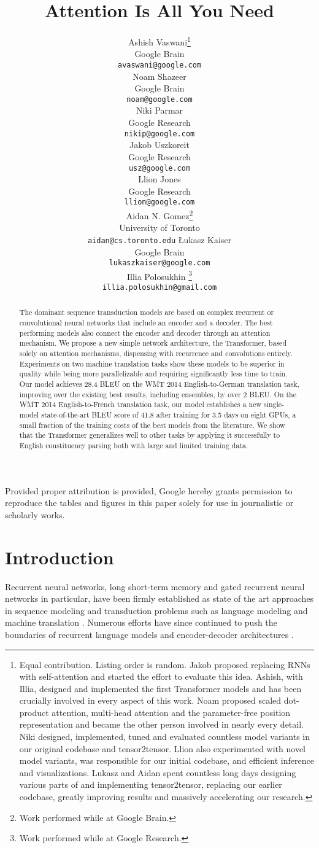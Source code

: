 \documentclass{article}
\title{Attention Is All You Need}
\author{
  \AND
  Ashish Vaswani\thanks{Equal contribution. Listing order is random. Jakob proposed replacing RNNs with self-attention and started the effort to evaluate this idea.
Ashish, with Illia, designed and implemented the first Transformer models and has been crucially involved in every aspect of this work. Noam proposed scaled dot-product attention, multi-head attention and the parameter-free position representation and became the other person involved in nearly every detail. Niki designed, implemented, tuned and evaluated countless model variants in our original codebase and tensor2tensor. Llion also experimented with novel model variants, was responsible for our initial codebase, and efficient inference and visualizations. Lukasz and Aidan spent countless long days designing various parts of and implementing tensor2tensor, replacing our earlier codebase, greatly improving results and massively accelerating our research.
}\\
  Google Brain\\
  \texttt{avaswani@google.com}\\
  \And
  Noam Shazeer\footnotemark[1]\\
  Google Brain\\
  \texttt{noam@google.com}\\
  \And
  Niki Parmar\footnotemark[1]\\
  Google Research\\
  \texttt{nikip@google.com}\\  
  \And
  Jakob Uszkoreit\footnotemark[1]\\
  Google Research\\
  \texttt{usz@google.com}\\
  \And  
  Llion Jones\footnotemark[1]\\
  Google Research\\
  \texttt{llion@google.com}\\   
  \And
  Aidan N. Gomez\footnotemark[1] \hspace{1.7mm}\thanks{Work performed while at Google Brain.}\\
  University of Toronto\\
  \texttt{aidan@cs.toronto.edu}
  \And
  {\L}ukasz Kaiser\footnotemark[1]\\
  Google Brain\\
  \texttt{lukaszkaiser@google.com}\\
  \And
  Illia Polosukhin\footnotemark[1]\hspace{1.7mm} \thanks{Work performed while at Google Research.}\\
  \texttt{illia.polosukhin@gmail.com}\\  
}
\begin{document}
\begin{center}
    \color{red}
    \large Provided proper attribution is provided, Google hereby grants permission to reproduce the tables and figures in this paper solely for use in journalistic or scholarly works.
\end{center}

\maketitle

\begin{abstract}
The dominant sequence transduction models are based on complex recurrent or convolutional neural networks that include an encoder and a decoder. The best performing models also connect the encoder and decoder through an attention mechanism. We propose a new simple network architecture, the Transformer, based solely on attention mechanisms, dispensing with recurrence and convolutions entirely. Experiments on two machine translation tasks show these models to be superior in quality while being  more parallelizable and requiring significantly less time to train. Our model achieves 28.4 BLEU on the WMT 2014 English-to-German translation task, improving over the existing best results, including ensembles, by over 2 BLEU.  On the WMT 2014 English-to-French translation task, our model establishes a new single-model state-of-the-art BLEU score of 41.8 after training for 3.5 days on eight GPUs, a small fraction of the training costs of the best models from the literature. We show that the Transformer generalizes well to other tasks by applying it successfully to English constituency parsing  both with large and limited training data.






\end{abstract}

\section{Introduction}

Recurrent neural networks, long short-term memory \citep{hochreiter1997} and gated recurrent \citep{gruEval14} neural networks in particular, have been firmly established as state of the art approaches in sequence modeling and transduction problems such as language modeling and machine translation \citep{sutskever14, bahdanau2014neural, cho2014learning}. Numerous efforts have since continued to push the boundaries of recurrent language models and encoder-decoder architectures \citep{wu2016google,luong2015effective,jozefowicz2016exploring}.
\end{document}
